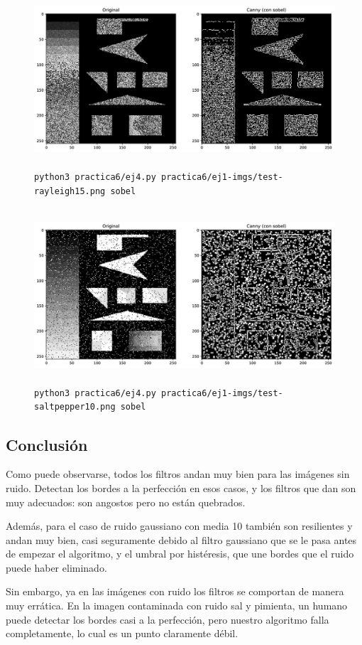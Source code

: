 \documentclass[11pt, spanish]{article}
\begin{document}
\begin{figure}[H]
\centering
    \includegraphics[height=6.5cm]{informe-imgs/ej4-sobel-test-rayleigh15.jpg}
    \caption{\texttt{python3 practica6/ej4.py practica6/ej1-imgs/test-rayleigh15.png sobel}}
\end{figure}

\begin{figure}[H]
\centering
    \includegraphics[height=6.5cm]{informe-imgs/ej4-sobel-test-saltpepper10.jpg}
    \caption{\texttt{python3 practica6/ej4.py practica6/ej1-imgs/test-saltpepper10.png sobel}}
\end{figure}

\newpage
\subsection{Conclusión}

Como puede observarse, todos los filtros andan muy bien para las imágenes sin ruido. Detectan los bordes a la perfección en esos casos, y los filtros que dan son muy adecuados: son angostos pero no están quebrados.

Además, para el caso de ruido gaussiano con media 10 también son resilientes y andan muy bien, casi seguramente debido al filtro gaussiano que se le pasa antes de empezar el algoritmo, y el umbral por histéresis, que une bordes que el ruido puede haber eliminado.

Sin embargo, ya en las imágenes con ruido los filtros se comportan de manera muy errática.
En la imagen contaminada con ruido sal y pimienta, un humano puede detectar los bordes casi a la perfección, pero nuestro algoritmo falla completamente, lo cual es un punto claramente débil.
\end{document}
